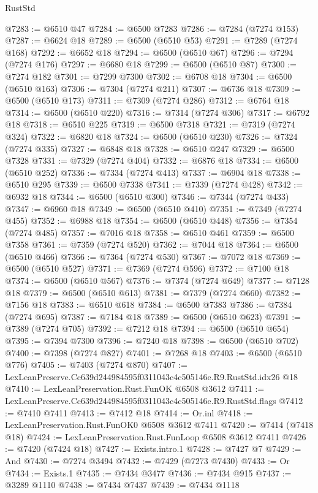 \begin{lexlean}{RustStd}
\begin{coremodule}
@7283 := @6510 @47
@7284 := @6500 @7283
@7286 := @7284 (@7274 @153)
@7287 := @6624 @18
@7289 := @6500 (@6510 @53)
@7291 := @7289 (@7274 @168)
@7292 := @6652 @18
@7294 := @6500 (@6510 @67)
@7296 := @7294 (@7274 @176)
@7297 := @6680 @18
@7299 := @6500 (@6510 @87)
@7300 := @7274 @182
@7301 := @7299 @7300
@7302 := @6708 @18
@7304 := @6500 (@6510 @163)
@7306 := @7304 (@7274 @211)
@7307 := @6736 @18
@7309 := @6500 (@6510 @173)
@7311 := @7309 (@7274 @286)
@7312 := @6764 @18
@7314 := @6500 (@6510 @220)
@7316 := @7314 (@7274 @306)
@7317 := @6792 @18
@7318 := @6510 @225
@7319 := @6500 @7318
@7321 := @7319 (@7274 @324)
@7322 := @6820 @18
@7324 := @6500 (@6510 @230)
@7326 := @7324 (@7274 @335)
@7327 := @6848 @18
@7328 := @6510 @247
@7329 := @6500 @7328
@7331 := @7329 (@7274 @404)
@7332 := @6876 @18
@7334 := @6500 (@6510 @252)
@7336 := @7334 (@7274 @413)
@7337 := @6904 @18
@7338 := @6510 @295
@7339 := @6500 @7338
@7341 := @7339 (@7274 @428)
@7342 := @6932 @18
@7344 := @6500 (@6510 @300)
@7346 := @7344 (@7274 @433)
@7347 := @6960 @18
@7349 := @6500 (@6510 @410)
@7351 := @7349 (@7274 @455)
@7352 := @6988 @18
@7354 := @6500 (@6510 @448)
@7356 := @7354 (@7274 @485)
@7357 := @7016 @18
@7358 := @6510 @461
@7359 := @6500 @7358
@7361 := @7359 (@7274 @520)
@7362 := @7044 @18
@7364 := @6500 (@6510 @466)
@7366 := @7364 (@7274 @530)
@7367 := @7072 @18
@7369 := @6500 (@6510 @527)
@7371 := @7369 (@7274 @596)
@7372 := @7100 @18
@7374 := @6500 (@6510 @567)
@7376 := @7374 (@7274 @649)
@7377 := @7128 @18
@7379 := @6500 (@6510 @613)
@7381 := @7379 (@7274 @660)
@7382 := @7156 @18
@7383 := @6510 @618
@7384 := @6500 @7383
@7386 := @7384 (@7274 @695)
@7387 := @7184 @18
@7389 := @6500 (@6510 @623)
@7391 := @7389 (@7274 @705)
@7392 := @7212 @18
@7394 := @6500 (@6510 @654)
@7395 := @7394 @7300
@7396 := @7240 @18
@7398 := @6500 (@6510 @702)
@7400 := @7398 (@7274 @827)
@7401 := @7268 @18
@7403 := @6500 (@6510 @776)
@7405 := @7403 (@7274 @870)
@7407 := LexLeanPreserve.Cc639d244984595f0311043c4c505146e.R9.RustStd.idx26 @18
@7410 := LexLeanPreservation.Rust.FunOK @6508 @3612
@7411 := LexLeanPreserve.Cc639d244984595f0311043c4c505146e.R9.RustStd.flags
@7412 := @7410 @7411
@7413 := @7412 @18
@7414 := Or.inl
@7418 := LexLeanPreservation.Rust.FunOK0 @6508 @3612 @7411
@7420 := @7414 (@7418 @18)
@7424 := LexLeanPreservation.Rust.FunLoop @6508 @3612 @7411
@7426 := @7420 (@7424 @18)
@7427 := Exists.intro.{1}
@7428 := @7427 @7
@7429 := And
@7430 := @7274 @3494
@7432 := @7429 (@7273 @7430)
@7433 := Or
@7434 := Exists.{1}
@7435 := @7434 @3477
@7436 := @7434 @915
@7437 := @3289 @1110
@7438 := @7434 @7437
@7439 := @7434 @1118

\end{coremodule}
\end{lexlean}
